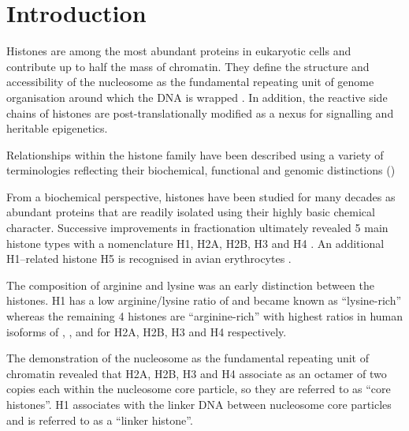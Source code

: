 \section{Introduction}

  Histones are among the most abundant proteins in eukaryotic cells and contribute up to half the mass of chromatin. 
  They define the structure and accessibility of the nucleosome as the fundamental repeating unit of genome organisation 
  around which the DNA is wrapped .
  In addition, the reactive side chains of histones are post-translationally modified 
  as a nexus for signalling and heritable epigenetics. 

  Relationships within the histone family have been described using a variety of terminologies
  reflecting their biochemical, functional and genomic distinctions ()
  
  From a biochemical perspective, histones have been studied for many decades 
  as abundant proteins that are readily isolated using their highly basic chemical character. 
  Successive improvements in fractionation ultimately revealed 5 main histone types 
  with a nomenclature H1, H2A, H2B, H3 and H4 \citep{nomenclature}.
  An additional H1--related histone H5 is recognised in avian erythrocytes \citep{HFive-review}.

  The composition of arginine and lysine was an early distinction between the histones. 
  H1 has a low arginine/lysine ratio of \LinkerArgLysRatio{} and became known as ``lysine-rich'' 
  whereas the remaining 4 histones are ``arginine-rich'' with highest ratios in human isoforms of 
  \HTwoAArgLysRatio{},  \HTwoBArgLysRatio{}, \HThreeArgLysRatio{} and \HFourArgLysRatio{}
  for H2A, H2B, H3 and H4 respectively.

  The demonstration of the nucleosome as the fundamental repeating unit of chromatin  
  revealed that H2A, H2B, H3 and H4 associate as an octamer of two copies each within the
  nucleosome core particle, so they are referred to as ``core histones''. 
  H1 associates with the linker DNA between nucleosome core particles and is referred to as a ``linker histone''.

